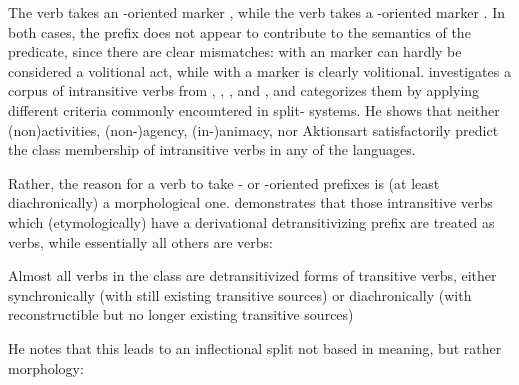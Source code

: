\xe
%
The  verb   takes an -oriented marker , while the  verb   takes a -oriented marker .
In both cases, the prefix does not appear to contribute to the semantics of the predicate, since there are clear mismatches:
 with an  marker can hardly be considered a volitional act, while   with a  marker is clearly volitional.
\textcite{meira2000split} investigates a corpus of intransitive verbs from \trio, \kalina, \apalai, and \wayana, and categorizes them by applying different criteria commonly encountered in split- systems.
He shows that neither (non\-)activities, %
(non-)agency, %
(in-)animacy, %
nor Aktionsart %
satisfactorily predict the class membership of intransitive verbs in any of the languages.

Rather, the reason for a verb to take - or -oriented prefixes is (at least diachronically) a morphological one.
\textcite[217--221]{meira2000split} demonstrates that those intransitive verbs which (etymologically) have a derivational detransitivizing prefix are treated as  verbs, while essentially all others are  verbs:
\begin{quotebox}{\parencite[201]{meira2000split}}
	Almost all verbs in the  class are detransitivized forms of transitive verbs, either synchronically (with still existing transitive sources) or diachronically (with reconstructible but no longer existing transitive sources)
\end{quotebox}
He notes that this leads to an inflectional split not based in meaning, but rather morphology:

